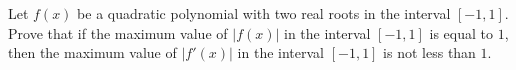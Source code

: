 Let $f(x)$ be a quadratic polynomial with two real roots in the interval $[-1,1]$. Prove that if the maximum value of $|f(x)|$ in the interval $[-1,1]$ is equal to $1$, then the maximum value of $|f'(x)|$ in the interval $[-1,1]$ is not less than $1$.